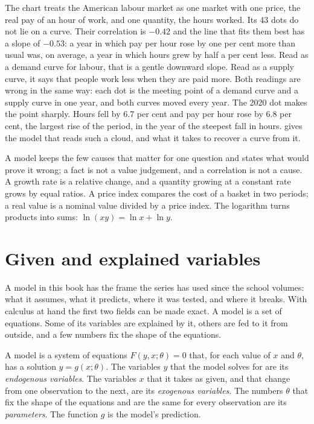 The chart treats the American labour market as one market with one price,
the real pay of an hour of work, and one quantity, the hours worked. Its
43 dots do not lie on a curve. Their correlation is $-0.42$ and the line
that fits them best has a slope of $-0.53$: a year in which pay per hour
rose by one per cent more than usual was, on average, a year in which hours
grew by half a per cent less. %
Read as a demand curve for labour, that is a gentle downward slope. Read as
a supply curve, it says that people work less when they are paid more. Both
readings are wrong in the same way: each dot is the meeting point of a
demand curve and a supply curve in one year, and both curves moved every
year. The 2020 dot makes the point sharply. Hours fell by 6.7 per cent and
pay per hour rose by 6.8 per cent, %
the largest rise of the period, in the year of the steepest fall in hours.
 gives the model that reads
such a cloud, and what it takes to recover a curve from it.

\begin{recall}
A model keeps the few causes that matter for one question and states what
would prove it wrong; a fact is not a value judgement, and a correlation is
not a cause. A growth rate is a relative change, and a quantity growing at
a constant rate grows by equal ratios. A price index compares the cost of a
basket in two periods; a real value is a nominal value divided by a price
index. The logarithm turns products into sums: $\ln(xy) = \ln x + \ln y$.
\end{recall}

\section{Given and explained variables}\label{sec:b1:models-and-data:variables}

A model in this book has the frame the series has used since the school
volumes: what it assumes, what it predicts, where it was tested, and where
it breaks. With calculus at hand the first two fields can be made exact. A
model is a set of equations. Some of its variables are explained by it,
others are fed to it from outside, and a few numbers fix the shape of the
equations.

\begin{definition}\label{def:b1:models-and-data:variables}
A model is a system of equations $F(y, x; \theta) = 0$ that, for each value
of $x$ and $\theta$, has a solution $y = g(x; \theta)$. The variables $y$
that the model solves for are its \emph{endogenous variables}. The variables
$x$ that it takes as given, and that change from one observation to the
next, are its \emph{exogenous variables}. The numbers $\theta$ that fix the
shape of the equations and are the same for every observation are its
\emph{parameters}. The function $g$ is the model's prediction.
\end{definition}


